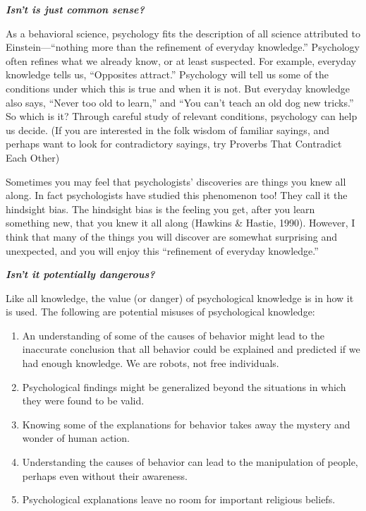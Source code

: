 \documentclass[
]{book}
\providecommand{\tightlist}{%
  \setlength{\itemsep}{0pt}\setlength{\parskip}{0pt}}
\begin{document}
\textbf{\emph{Isn't is just common sense?}}

As a behavioral science, psychology fits the description of all science attributed to Einstein---``nothing more than the refinement of everyday knowledge.'' Psychology often refines what we already know, or at least suspected. For example, everyday knowledge tells us, ``Opposites attract.'' Psychology will tell us some of the conditions under which this is true and when it is not. But everyday knowledge also says, ``Never too old to learn,'' and ``You can't teach an old dog new tricks.'' So which is it? Through careful study of relevant conditions, psychology can help us decide.
(If you are interested in the folk wisdom of familiar sayings, and perhaps want to look for contradictory sayings, try Proverbs That Contradict Each Other)

Sometimes you may feel that psychologists' discoveries are things you knew all along. In fact psychologists have studied this phenomenon too! They call it the hindsight bias. The hindsight bias is the feeling you get, after you learn something new, that you knew it all along (Hawkins \& Hastie, 1990). However, I think that many of the things you will discover are somewhat surprising and unexpected, and you will enjoy this ``refinement of everyday knowledge.''

\textbf{\emph{Isn't it potentially dangerous?}}

Like all knowledge, the value (or danger) of psychological knowledge is in how it is used. The following are potential misuses of psychological knowledge:

\begin{enumerate}
\def\labelenumi{\arabic{enumi}.}
\tightlist
\item
  An understanding of some of the causes of behavior might lead to the inaccurate conclusion that all behavior could be explained and predicted if we had enough knowledge. We are robots, not free individuals.\\
\item
  Psychological findings might be generalized beyond the situations in which they were found to be valid.\\
\item
  Knowing some of the explanations for behavior takes away the mystery and wonder of human action.\\
\item
  Understanding the causes of behavior can lead to the manipulation of people, perhaps even without their awareness.\\
\item
  Psychological explanations leave no room for important religious beliefs.
\end{enumerate}
\end{document}
